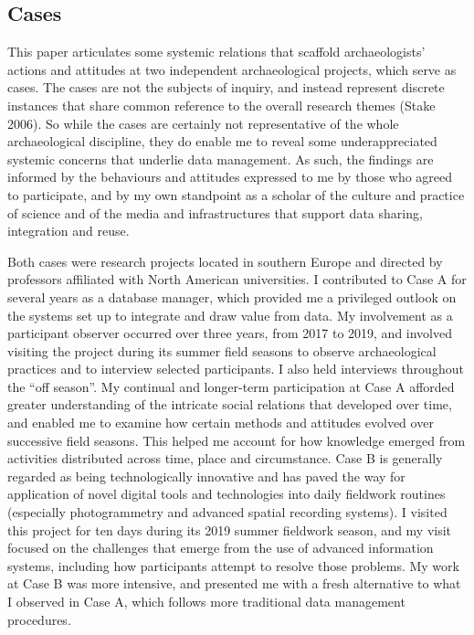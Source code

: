 \documentclass[
  canadian,
]{article}
\begin{document}
\subsection{Cases}\label{cases}

This paper articulates some systemic relations that scaffold
archaeologists' actions and attitudes at two independent archaeological
projects, which serve as cases. The cases are not the subjects of
inquiry, and instead represent discrete instances that share common
reference to the overall research themes (Stake 2006). So while the
cases are certainly not representative of the whole archaeological
discipline, they do enable me to reveal some underappreciated systemic
concerns that underlie data management. As such, the findings are
informed by the behaviours and attitudes expressed to me by those who
agreed to participate, and by my own standpoint as a scholar of the
culture and practice of science and of the media and infrastructures
that support data sharing, integration and reuse.

Both cases were research projects located in southern Europe and
directed by professors affiliated with North American universities. I
contributed to Case A for several years as a database manager, which
provided me a privileged outlook on the systems set up to integrate and
draw value from data. My involvement as a participant observer occurred
over three years, from 2017 to 2019, and involved visiting the project
during its summer field seasons to observe archaeological practices and
to interview selected participants. I also held interviews throughout
the ``off season''. My continual and longer-term participation at Case A
afforded greater understanding of the intricate social relations that
developed over time, and enabled me to examine how certain methods and
attitudes evolved over successive field seasons. This helped me account
for how knowledge emerged from activities distributed across time, place
and circumstance. Case B is generally regarded as being technologically
innovative and has paved the way for application of novel digital tools
and technologies into daily fieldwork routines (especially
photogrammetry and advanced spatial recording systems). I visited this
project for ten days during its 2019 summer fieldwork season, and my
visit focused on the challenges that emerge from the use of advanced
information systems, including how participants attempt to resolve those
problems. My work at Case B was more intensive, and presented me with a
fresh alternative to what I observed in Case A, which follows more
traditional data management procedures.
\end{document}
